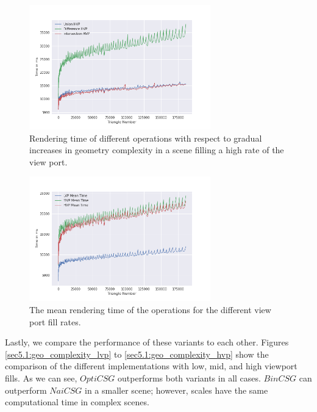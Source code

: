 \documentclass[a4paper,11pt,oneside]{article}
\begin{document}
\begin{figure}[H]
	\centering
	\includegraphics[width=0.7\textwidth]{section5/plots/optim_csg_hvp.png}
	\caption{Rendering time of different operations with respect to gradual increases in geometry complexity in a scene filling a high rate of the view port.}
	\label{sec5.1:optim_operations_hvp}
\end{figure}
\begin{figure}[H]
	\centering
	\includegraphics[width=0.7\textwidth]{section5/plots/optim_csg_mean.png}
	\caption{The mean rendering time of the operations for the different view port fill rates.}
	\label{sec5.1:bin_operations}
\end{figure}

Lastly, we compare the performance of these variants to each other. Figures \ref{sec5.1:geo_complexity_lvp} to \ref{sec5.1:geo_complexity_hvp} show the comparison of the different implementations with low, mid, and high viewport fills. As we can see, $OptiCSG$ outperforms both variants in all cases. $BinCSG$ can outperform $NaiCSG$ in a smaller scene; however, scales have the same computational time in complex scenes.
\end{document}
